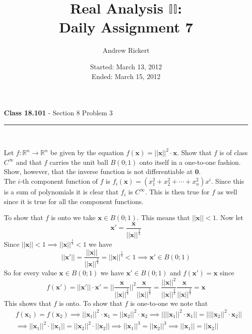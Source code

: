 \documentclass[11pt,reqno]{article}
\title{Real Analysis $\mathbb{II}$: \\ Daily Assignment 7}
\author{Andrew Rickert}
\date{Started: March 13, 2012 \\ \hspace{1pt} Ended: March 15,  2012}                                           %
\begin{document}
\maketitle

\begin{flushleft} 
\textbf{Class 18.101} - Section 8 Problem 3\\
\rule{500pt}{1pt}\\
\end{flushleft} 

Let $f : \mathbb{R}^n \to \mathbb{R}^n$ be given by the equation $f(\textbf{x}) = ||\textbf{x}||^2 \cdot \textbf{x}$. Show that $f$ is of class $C^\infty$ and that $f$ carries the unit ball $B(0;1)$ onto itself in a one-to-one fashion. Show, however, that the inverse function is not differentiable at $\textbf{0}$.\\

The $i$-th component function of $f$ is $f_i(\textbf{x}) = (x_1^2 + x_2^2 + \cdots + x_n^2) x^i$. Since this is a sum of polynomials it is clear that $f_i$ is $C^\infty$. This is then true for $f$ as well since it is true for all the component functions.

To show that $f$ is onto we take $\textbf{x} \in B(0;1)$. This means that $||\textbf{x}|| < 1$. Now let \[ \textbf{x}' = \frac{\textbf{x}}{||\textbf{x}||^{\frac{2}{3}}} \]
Since $||\textbf{x}|| < 1 \implies ||\textbf{x}||^{\frac{1}{3}} < 1$ we have 
\[ ||\textbf{x}'|| = \frac{||\textbf{x}||}{||\textbf{x}||^{\frac{2}{3}}} = ||\textbf{x}||^{\frac{1}{3}} < 1 \implies \textbf{x}' \in B(0;1) \]
So for every value $\textbf{x} \in B(0;1)$ we have $\textbf{x}' \in B(0;1)$ and $f(\textbf{x}') = \textbf{x}$ since 
\[ f(\textbf{x}') = ||\textbf{x}'|| \cdot \textbf{x}' = || \frac{\textbf{x}}{||\textbf{x}||^{\frac{2}{3}}} ||^2 \frac{\textbf{x}}{||\textbf{x}||^{\frac{2}{3}}} =  \frac{||\textbf{x}||^2}{||\textbf{x}||^{\frac{4}{3}}} \frac{\textbf{x}}{||\textbf{x}||^{\frac{2}{3}}} = \textbf{x} \]
This shows that $f$ is onto.
To show that $f$ is one-to-one we note that 
\begin{align*}
& f(\textbf{x}_1) = f(\textbf{x}_2) \implies ||\textbf{x}_1||^2\cdot \textbf{x}_1 = ||\textbf{x}_2||^2\cdot \textbf{x}_2 \implies ||||\textbf{x}_1||^2\cdot \textbf{x}_1 || = ||||\textbf{x}_2||^2\cdot \textbf{x}_2|| \\
& \implies  ||\textbf{x}_1||^2\cdot ||\textbf{x}_1|| = ||\textbf{x}_2||^2\cdot ||\textbf{x}_2|| \implies ||\textbf{x}_1||^3 = ||\textbf{x}_2||^3 \implies ||\textbf{x}_1|| = ||\textbf{x}_2||
\end{align*}
\end{document}
